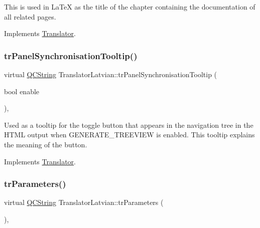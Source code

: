 This is used in La\+TeX as the title of the chapter containing the documentation of all related pages. 

Implements \mbox{\hyperlink{class_translator}{Translator}}.

\mbox{\label{class_translator_latvian_ac9133a6359ba4c605ddfbbdb1a4db12a}} 
\subsubsection{\texorpdfstring{trPanelSynchronisationTooltip()}{trPanelSynchronisationTooltip()}}
{\footnotesize\ttfamily virtual \mbox{\hyperlink{class_q_c_string}{Q\+C\+String}} Translator\+Latvian\+::tr\+Panel\+Synchronisation\+Tooltip (\begin{DoxyParamCaption}\item[{bool}]{enable }\end{DoxyParamCaption})\hspace{0.3cm}{\ttfamily [inline]}, {\ttfamily [virtual]}}

Used as a tooltip for the toggle button that appears in the navigation tree in the H\+T\+ML output when G\+E\+N\+E\+R\+A\+T\+E\+\_\+\+T\+R\+E\+E\+V\+I\+EW is enabled. This tooltip explains the meaning of the button. 

Implements \mbox{\hyperlink{class_translator}{Translator}}.

\mbox{\label{class_translator_latvian_aa4bd4a2b667e18ecab7b28383604f6f8}} 
\subsubsection{\texorpdfstring{trParameters()}{trParameters()}}
{\footnotesize\ttfamily virtual \mbox{\hyperlink{class_q_c_string}{Q\+C\+String}} Translator\+Latvian\+::tr\+Parameters (\begin{DoxyParamCaption}{ }\end{DoxyParamCaption})\hspace{0.3cm}{\ttfamily [inline]}, {\ttfamily [virtual]}}

